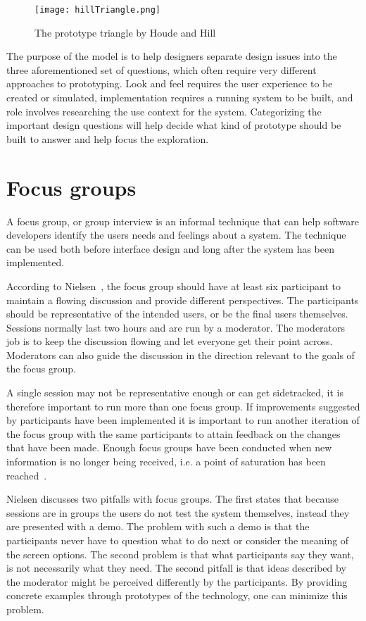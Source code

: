 \begin{figure}[h!]
	\centering
		\texttt{[image: hillTriangle.png]}
		\caption{\footnotesize The prototype triangle by Houde and Hill~\cite{prototypesPrototype}}
		\label{fig:hillTriangle}
\end{figure}

The purpose of the model is to help designers separate design issues into the three aforementioned set of questions, which often require very different approaches to prototyping. Look and feel requires the user experience to be created or simulated, implementation requires a running system to be built, and role involves researching the use context for the system. Categorizing the important design questions will help decide what kind of prototype should be built to answer and help focus the exploration.

\section{Focus groups}
\label{sec:focusGroup}
A focus group, or group interview is an informal technique that can help software developers identify the users needs and feelings about a system. The technique can be used both before interface design and long after the system has been implemented. 

According to Nielsen~\cite{focusGroup}, the focus group should have at least six participant to maintain a flowing discussion and provide different perspectives. The participants should be representative of the intended users, or be the final users themselves. Sessions normally last two hours and are run by a moderator. The moderators job is to keep the discussion flowing and let everyone get their point across. Moderators can also guide the discussion in the direction relevant to the goals of the focus group. 

A single session may not be representative enough or can get sidetracked, it is therefore important to run more than one focus group. If improvements suggested by participants have been implemented it is important to run another iteration of the focus group with the same participants to attain feedback on the changes that have been made. Enough focus groups have been conducted when new information is no longer being received, i.e. a point of saturation has been reached~\cite{howFocusGroup}. 

Nielsen discusses two pitfalls with focus groups. The first states that because sessions are in groups the users do not test the system themselves, instead they are presented with a demo. The problem with such a demo is that the participants never have to question what to do next or consider the meaning of the screen options. The second problem is that what participants say they want, is not necessarily what they need. The second pitfall is that ideas described by the moderator might be perceived differently by the participants. By providing concrete examples through prototypes of the technology, one can minimize this problem.

